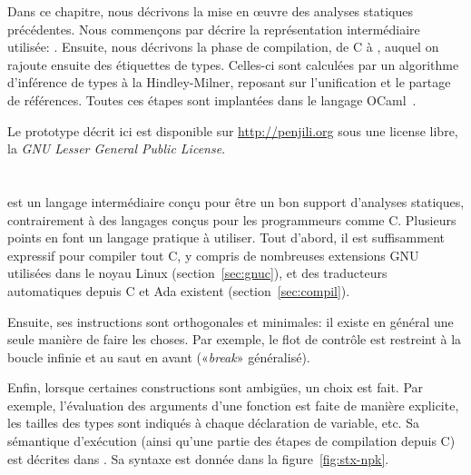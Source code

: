Dans ce chapitre, nous décrivons la mise en œuvre des analyses statiques
précédentes. Nous commençons par décrire la représentation intermédiaire
utilisée: \newspeak. Ensuite, nous décrivons la phase de compilation, de C à
\newspeak, auquel on rajoute ensuite des étiquettes de types. Celles-ci sont
calculées par un algorithme d'inférence de types à la Hindley-Milner, reposant
sur l'unification et le partage de références. Toutes ces étapes sont implantées
dans le langage OCaml~\cite{DAOC}.

Le prototype décrit ici est disponible sur \url{http://penjili.org} sous une
license libre, la \emph{GNU Lesser General Public License}.

\section{\newspeak}
\label{sec:npk}

\newspeak est un langage intermédiaire conçu pour être un bon support d'analyses
statiques, contrairement à des langages conçus pour les programmeurs comme C.
Plusieurs points en font un langage pratique à utiliser. Tout d'abord, il est
suffisamment expressif pour compiler tout C, y compris de nombreuses extensions
GNU utilisées dans le noyau Linux (section~\ref{sec:gnuc}), et des traducteurs
automatiques depuis C et Ada existent (section~\ref{sec:compil}).

Ensuite, ses instructions sont orthogonales et minimales: il existe en général
une seule manière de faire les choses. Par exemple, le flot de contrôle est
restreint à la boucle infinie et au saut en avant («\emph{break}» généralisé).

Enfin, lorsque certaines constructions sont ambigües, un choix est fait. Par
exemple, \linebreak l'évaluation des arguments d'une fonction est faite de
manière explicite, les tailles des types sont indiqués à chaque déclaration de
variable, etc. Sa sémantique d'exécution (ainsi qu'une partie des étapes de
compilation depuis C) est décrites dans \cite{newspeak}. Sa syntaxe est donnée
dans la figure~\ref{fig:stx-npk}.


